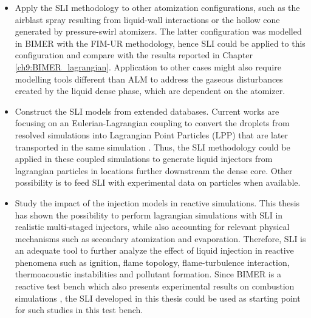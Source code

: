 \begin{itemize}
	\item Apply the SLI methodology to other atomization configurations, such as the airblast spray resulting from liquid-wall interactions or the hollow cone generated by pressure-swirl atomizers. The latter configuration was modelled in BIMER with the FIM-UR methodology, hence SLI could be applied to this configuration and compare with the results reported in Chapter \ref{ch9:BIMER_lagrangian}. Application to other cases might also require modelling tools different than ALM to address the gaseous disturbances created by the liquid dense phase, which are dependent on the atomizer.
	
	\item Construct the SLI models from extended databases. Current works are focusing on an Eulerian-Lagrangian coupling to convert the droplets from resolved simulations into Lagrangian Point Particles (LPP) that are later transported in the same simulation . Thus, the SLI methodology could be applied in these coupled simulations to generate liquid injectors from lagrangian particles in locations further downstream the dense core. Other possibility is to feed SLI with experimental data on particles when available.  
	
	\item Study the impact of the injection models in reactive simulations. This thesis has shown the possibility to perform lagrangian simulations with SLI in realistic multi-staged injectors, while also accounting for relevant physical mechanisms such as secondary atomization and evaporation. Therefore, SLI is an adequate tool to further analyze the effect of liquid injection in reactive phenomena such as ignition, flame topology, flame-turbulence interaction, thermoacoustic instabilities and pollutant formation. Since BIMER is a reactive test bench which also presents experimental results on combustion simulations , the SLI developed in this thesis could be used as starting point for such studies in this test bench.
	
	
	



\end{itemize}

